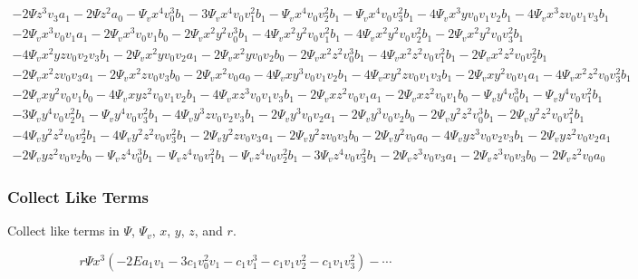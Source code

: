 \documentclass{beamer}
\begin{document}
\begin{frame}
\[\begin{array}{l}
\\
-2 \Psi z^3 v_3 a_1-2 \Psi z^2 a_0-\Psi_v x^4 v_0^3 b_1-3 \Psi_v x^4 v_0 v_1^2 b_1-\Psi_v x^4 v_0 v_2^2 b_1-\Psi_v x^4 v_0 v_3^2 b_1-4 \Psi_v x^3 y v_0 v_1 v_2 b_1-4 \Psi_v x^3 z v_0 v_1 v_3 b_1
\\
-2 \Psi_v x^3 v_0 v_1 a_1-2 \Psi_v x^3 v_0 v_1 b_0-2 \Psi_v x^2 y^2 v_0^3 b_1-4 \Psi_v x^2 y^2 v_0 v_1^2 b_1-4 \Psi_v x^2 y^2 v_0 v_2^2 b_1-2 \Psi_v x^2 y^2 v_0 v_3^2 b_1
\\
-4 \Psi_v x^2 y z v_0 v_2 v_3 b_1-2 \Psi_v x^2 y v_0 v_2 a_1-2 \Psi_v x^2 y v_0 v_2 b_0-2 \Psi_v x^2 z^2 v_0^3 b_1-4 \Psi_v x^2 z^2 v_0 v_1^2 b_1-2 \Psi_v x^2 z^2 v_0 v_2^2 b_1
\\
-2 \Psi_v x^2 z v_0 v_3 a_1-2 \Psi_v x^2 z v_0 v_3 b_0-2 \Psi_v x^2 v_0 a_0-4 \Psi_v x y^3 v_0 v_1 v_2 b_1-4 \Psi_v x y^2 z v_0 v_1 v_3 b_1-2 \Psi_v x y^2 v_0 v_1 a_1-4 \Psi_v x^2 z^2 v_0 v_3^2 b_1
\\
-2 \Psi_v x y^2 v_0 v_1 b_0-4 \Psi_v x y z^2 v_0 v_1 v_2 b_1-4 \Psi_v x z^3 v_0 v_1 v_3 b_1-2 \Psi_v x z^2 v_0 v_1 a_1-2 \Psi_v x z^2 v_0 v_1 b_0-\Psi_v y^4 v_0^3 b_1-\Psi_v y^4 v_0 v_1^2 b_1
\\
-3 \Psi_v y^4 v_0 v_2^2 b_1-\Psi_v y^4 v_0 v_3^2 b_1-4 \Psi_v y^3 z v_0 v_2 v_3 b_1-2 \Psi_v y^3 v_0 v_2 a_1-2 \Psi_v y^3 v_0 v_2 b_0-2 \Psi_v y^2 z^2 v_0^3 b_1-2 \Psi_v y^2 z^2 v_0 v_1^2 b_1
\\
-4 \Psi_v y^2 z^2 v_0 v_2^2 b_1-4 \Psi_v y^2 z^2 v_0 v_3^2 b_1-2 \Psi_v y^2 z v_0 v_3 a_1-2 \Psi_v y^2 z v_0 v_3 b_0-2 \Psi_v y^2 v_0 a_0-4 \Psi_v y z^3 v_0 v_2 v_3 b_1-2 \Psi_v y z^2 v_0 v_2 a_1
\\
-2 \Psi_v y z^2 v_0 v_2 b_0-\Psi_v z^4 v_0^3 b_1-\Psi_v z^4 v_0 v_1^2 b_1-\Psi_v z^4 v_0 v_2^2 b_1-3 \Psi_v z^4 v_0 v_3^2 b_1-2 \Psi_v z^3 v_0 v_3 a_1-2 \Psi_v z^3 v_0 v_3 b_0-2 \Psi_v z^2 v_0 a_0
\end{array}
\]
\end{frame}

\begin{frame}
\frametitle{Collect Like Terms}
Collect like terms in $\Psi$, $\Psi_v$, $x$, $y$, $z$, and $r$.

\[ r\Psi x^3 \left(-2 E a_1 v_1 - 3 c_1 v_0^2 v_1 - c_1 v_1^3 - c_1 v_1 v_2^2 - c_1 v_1 v_3^2\right) - \cdots \]
\end{frame}
\end{document}
